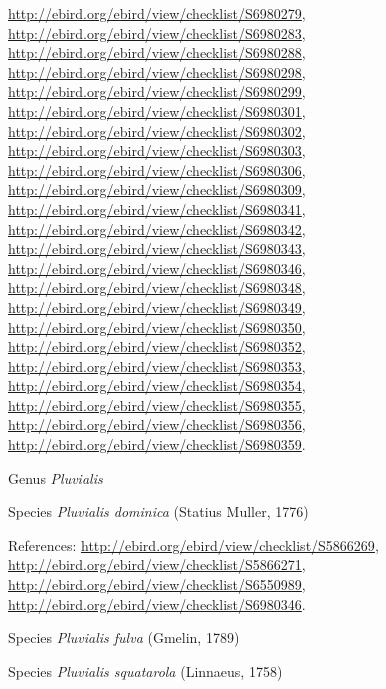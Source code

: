 \documentclass[9pt, article]{memoir}
\begin{document}
\begin{multicols}{2}
\url{http://ebird.org/ebird/view/checklist/S6980279}, 
\url{http://ebird.org/ebird/view/checklist/S6980283}, 
\url{http://ebird.org/ebird/view/checklist/S6980288}, 
\url{http://ebird.org/ebird/view/checklist/S6980298}, 
\url{http://ebird.org/ebird/view/checklist/S6980299}, 
\url{http://ebird.org/ebird/view/checklist/S6980301}, 
\url{http://ebird.org/ebird/view/checklist/S6980302}, 
\url{http://ebird.org/ebird/view/checklist/S6980303}, 
\url{http://ebird.org/ebird/view/checklist/S6980306}, 
\url{http://ebird.org/ebird/view/checklist/S6980309}, 
\url{http://ebird.org/ebird/view/checklist/S6980341}, 
\url{http://ebird.org/ebird/view/checklist/S6980342}, 
\url{http://ebird.org/ebird/view/checklist/S6980343}, 
\url{http://ebird.org/ebird/view/checklist/S6980346}, 
\url{http://ebird.org/ebird/view/checklist/S6980348}, 
\url{http://ebird.org/ebird/view/checklist/S6980349}, 
\url{http://ebird.org/ebird/view/checklist/S6980350}, 
\url{http://ebird.org/ebird/view/checklist/S6980352}, 
\url{http://ebird.org/ebird/view/checklist/S6980353}, 
\url{http://ebird.org/ebird/view/checklist/S6980354}, 
\url{http://ebird.org/ebird/view/checklist/S6980355}, 
\url{http://ebird.org/ebird/view/checklist/S6980356}, 
\url{http://ebird.org/ebird/view/checklist/S6980359}.

\vspace{6pt}\noindent\hspace{30pt}Genus \textit{Pluvialis}


\vspace{6pt}\noindent\hspace{36pt}Species \textit{Pluvialis dominica} (Statius Muller, 1776)


\vspace{6pt}References: 
\url{http://ebird.org/ebird/view/checklist/S5866269}, 
\url{http://ebird.org/ebird/view/checklist/S5866271}, 
\url{http://ebird.org/ebird/view/checklist/S6550989}, 
\url{http://ebird.org/ebird/view/checklist/S6980346}.

\vspace{6pt}\noindent\hspace{36pt}Species \textit{Pluvialis fulva} (Gmelin, 1789)


\vspace{6pt}\noindent\hspace{36pt}Species \textit{Pluvialis squatarola} (Linnaeus, 1758)



\end{multicols}
\end{document}
